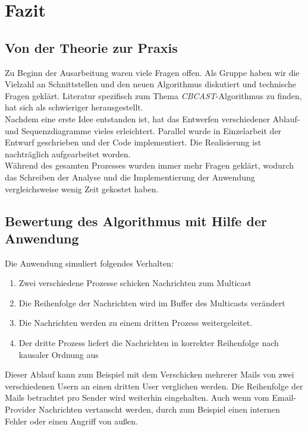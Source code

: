 \section{Fazit}

\subsection{Von der Theorie zur Praxis}

Zu Beginn der Ausarbeitung waren viele Fragen offen. Als Gruppe haben wir die Vielzahl an Schnittstellen und den neuen Algorithmus diskutiert und technische Fragen geklärt. Literatur spezifisch zum Thema \textit{CBCAST}-Algorithmus zu finden, hat sich als schwieriger herausgestellt.\\
Nachdem eine erste Idee entstanden ist, hat das Entwerfen verschiedener Ablauf- und Sequenzdiagramme vieles erleichtert. Parallel wurde in Einzelarbeit der Entwurf geschrieben und der Code implementiert. Die Realisierung ist nachträglich aufgearbeitet worden.\\
Während des gesamten Prozesses wurden immer mehr Fragen geklärt, wodurch das Schreiben der Analyse und die Implementierung der Anwendung vergleichsweise wenig Zeit gekostet haben.

\subsection{Bewertung des Algorithmus mit Hilfe der Anwendung}

Die Anwendung simuliert folgendes Verhalten:

\begin{enumerate}
    \item Zwei verschiedene Prozesse schicken Nachrichten zum Multicast
    \item Die Reihenfolge der Nachrichten wird im Buffer des Multicasts verändert
    \item Die Nachrichten werden zu einem dritten Prozess weitergeleitet.
    \item Der dritte Prozess liefert die Nachrichten in korrekter Reihenfolge nach kausaler Ordnung aus
\end{enumerate}

Dieser Ablauf kann zum Beispiel mit dem Verschicken mehrerer Mails von zwei verschiedenen Usern an einen dritten User verglichen werden. Die Reihenfolge der Mails betrachtet pro Sender wird weiterhin eingehalten. Auch wenn vom Email-Provider Nachrichten vertauscht werden, durch zum Beispiel einen internen Fehler oder einen Angriff von außen.\\

